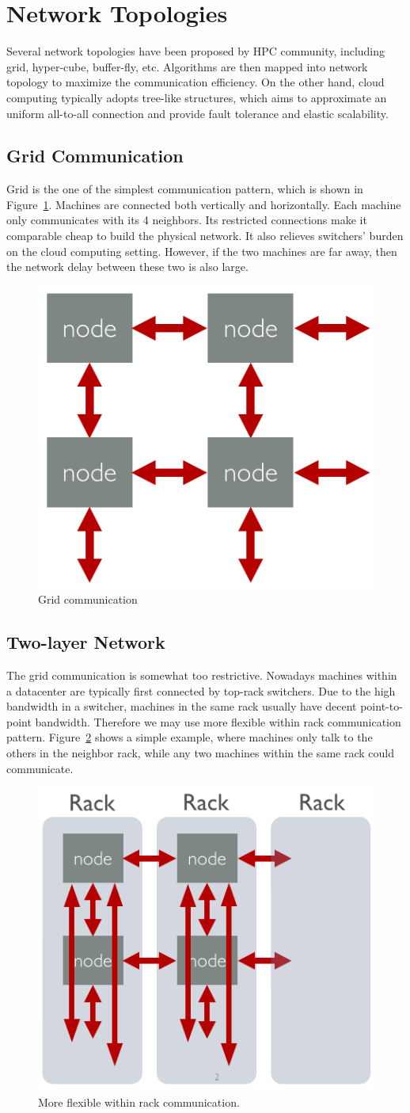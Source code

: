\documentclass{acm_proc_article-sp}
\begin{document}
\section{Network Topologies}
\label{sec:network-topologies}

Several network topologies have been proposed by HPC community, including grid,
hyper-cube, buffer-fly, etc. Algorithms are then mapped into network topology to
maximize the communication efficiency. On the other hand, cloud computing
typically adopts
tree-like structures, which aims to approximate an uniform all-to-all connection
and provide fault tolerance and elastic scalability.

\subsection{Grid Communication}

Grid is the one of the simplest communication pattern, which is shown in
Figure~\ref{fig:grid2}. Machines are connected both vertically and
horizontally. Each machine only communicates with its 4 neighbors. Its
restricted connections make it comparable cheap to build the physical
network. It also relieves switchers' burden on the cloud computing setting.
However, if the two machines are far away, then the network delay between these
two is also large.


\begin{figure}[th!]
  \centering
  \includegraphics[width=.25\textwidth]{fig/grid}
  \caption{Grid communication}
  \label{fig:grid2}
\end{figure}


\subsection{Two-layer Network}

The grid communication is somewhat too restrictive. Nowadays machines within a
datacenter are typically first connected by top-rack switchers. Due to the high
bandwidth in a switcher, machines in the same rack usually have decent
point-to-point bandwidth. Therefore we may use more flexible within rack
communication pattern. Figure~\ref{fig:rack} shows a simple example, where
machines only talk to the others in the neighbor rack, while any two machines
within the same rack could communicate.
\begin{figure}[th!]
  \centering
  \includegraphics[width=.25\textwidth]{fig/rack}
  \caption{More flexible within rack communication.}
  \label{fig:rack}
\end{figure}
\end{document}
